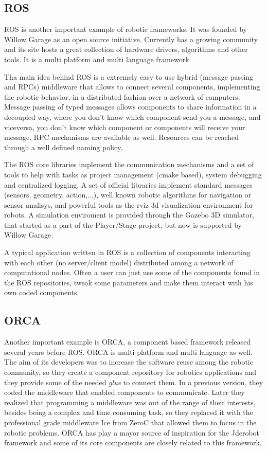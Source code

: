 \documentclass[twocolumn]{svjour3}          %
\begin{document}
\subsection{ROS}
ROS is another important example of robotic frameworks. It was founded by Willow Garage as an open source initiative. Currently has a growing community
and its site hosts a great collection of hardware drivers, algorithms
and other tools. It is a multi platform and multi language framework.

Tha main idea behind ROS is a extremely easy to use hybrid (message passing and RPCs) middleware that allows to connect several components, implementing the robotic behavior, in a distributed fashion over a network of computers. Message passing of typed messages allows components to share information in a decoupled way, where you don't know which component send you a message, and viceversa, you don't know which component or components will receive your message. RPC mechanisms are available as well. Resources can be reached through a well defined naming policy.

The ROS core libraries implement the communication mechanisms and a set of tools to help with tasks as project management (cmake based), system
debugging and centralized logging. A set of official libraries implement standard messages (sensors, geometry, action,...), well known robotic algorithms for navigation or sensor analisys, and powerful tools as the rviz 3d visualization environment for robots. A simulation enviroment is provided through the Gazebo 3D simulator, that started as a part of the Player/Stage project, but now is supported by Willow Garage.

A typical application written in ROS is a collection of components interacting with each other (no server/client model) distributed among a network of computational nodes. Often a user can just use some of the components found in the ROS repositories, tweak some parameters and make them interact with his own coded components.

\subsection{ORCA}
Another important example is ORCA, a component based framework released several years before ROS. ORCA is multi platform and multi language as well. The aim of its developers was to increase the software reuse among the robotic community, so they create a component repository for robotics applications and they provide some of the needed \textit{glue} to connect them. In a previous version, they coded the middleware that enabled components to communicate. Later they realized that programming a middleware was out of the range of their interests, besides being a complex and time consuming task, so they replaced it with the professional grade middleware Ice from ZeroC \cite{henning04} that allowed them to focus in the robotic problems. ORCA has play a mayor source of inspiration for the Jderobot framework and some of its core components are closely related to this framework.
\end{document}
